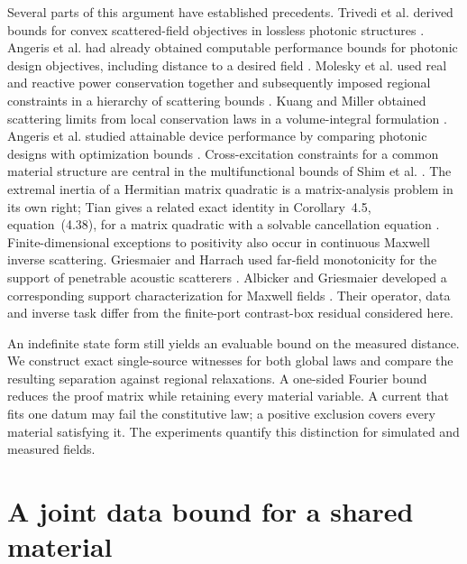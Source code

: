 \documentclass[anonymous,12pt]{iopjournal}
\theoremstyle{remark}\newtheorem{remark}[theorem]{Remark}
\numberwithin{equation}{section}
\begin{document}
Several parts of this argument have established precedents. Trivedi et al. derived bounds for convex scattered-field objectives in lossless photonic structures \cite{trivedi}. Angeris et al. had already obtained computable performance bounds for photonic design objectives, including distance to a desired field \cite{angeris19}. Molesky et al. used real and reactive power conservation together and subsequently imposed regional constraints in a hierarchy of scattering bounds \cite{moleskyglobal,moleskylocal}. Kuang and Miller obtained scattering limits from local conservation laws in a volume-integral formulation \cite{kuang}. Angeris et al. studied attainable device performance by comparing photonic designs with optimization bounds \cite{angeris}. Cross-excitation constraints for a common material structure are central in the multifunctional bounds of Shim et al. \cite{shim}. The extremal inertia of a Hermitian matrix quadratic is a matrix-analysis problem in its own right; Tian gives a related exact identity in Corollary~4.5, equation~(4.38), for a matrix quadratic with a solvable cancellation equation \cite{tian}. Finite-dimensional exceptions to positivity also occur in continuous Maxwell inverse scattering. Griesmaier and Harrach used far-field monotonicity for the support of penetrable acoustic scatterers \cite{griesmaier_harrach,griesmaier_harrach_erratum}. Albicker and Griesmaier developed a corresponding support characterization for Maxwell fields \cite{albicker}. Their operator, data and inverse task differ from the finite-port contrast-box residual considered here.

An indefinite state form still yields an evaluable bound on the measured distance. We construct exact single-source witnesses for both global laws and compare the resulting separation against regional relaxations. A one-sided Fourier bound reduces the proof matrix while retaining every material variable. A current that fits one datum may fail the constitutive law; a positive exclusion covers every material satisfying it. The experiments quantify this distinction for simulated and measured fields.

\section{A joint data bound for a shared material}\label{sec:joint}
\end{document}
